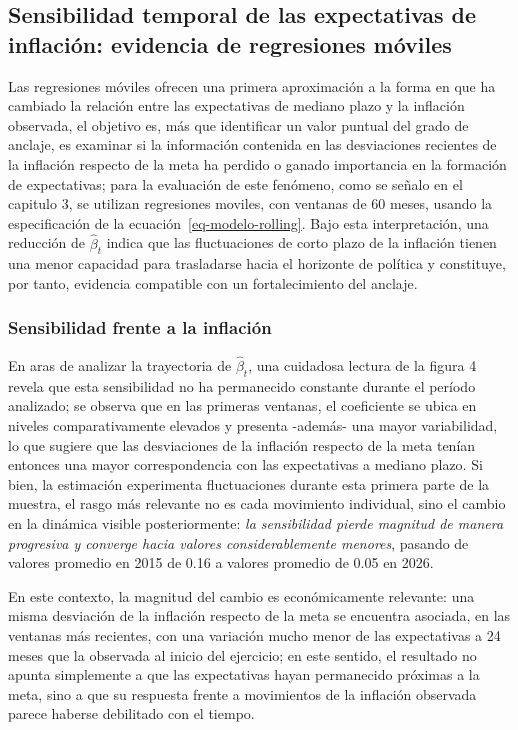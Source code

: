 \documentclass[
  10.5pt,
  letterpaper,
  twocolumn]{article}
\begin{document}
\subsection{Sensibilidad temporal de las expectativas de inflación:
evidencia de regresiones
móviles}\label{sensibilidad-temporal-de-las-expectativas-de-inflaciuxf3n-evidencia-de-regresiones-muxf3viles}

Las regresiones móviles ofrecen una primera aproximación a la forma en
que ha cambiado la relación entre las expectativas de mediano plazo y la
inflación observada, el objetivo es, más que identificar un valor
puntual del grado de anclaje, es examinar si la información contenida en
las desviaciones recientes de la inflación respecto de la meta ha
perdido o ganado importancia en la formación de expectativas; para la
evaluación de este fenómeno, como se señalo en el capitulo 3, se
utilizan regresiones moviles, con ventanas de 60 meses, usando la
especificación de la ecuación~\ref{eq-modelo-rolling}. Bajo esta
interpretación, una reducción de \(\widehat{\beta}_t\) indica que las
fluctuaciones de corto plazo de la inflación tienen una menor capacidad
para trasladarse hacia el horizonte de política y constituye, por tanto,
evidencia compatible con un fortalecimiento del anclaje.

\subsubsection{Sensibilidad frente a la
inflación}\label{sensibilidad-frente-a-la-inflaciuxf3n}

En aras de analizar la trayectoria de \(\widehat{\beta}_t\), una
cuidadosa lectura de la figura 4 revela que esta sensibilidad no ha
permanecido constante durante el período analizado; se observa que en
las primeras ventanas, el coeficiente se ubica en niveles
comparativamente elevados y presenta -además- una mayor variabilidad, lo
que sugiere que las desviaciones de la inflación respecto de la meta
tenían entonces una mayor correspondencia con las expectativas a mediano
plazo. Si bien, la estimación experimenta fluctuaciones durante esta
primera parte de la muestra, el rasgo más relevante no es cada
movimiento individual, sino el cambio en la dinámica visible
posteriormente: \emph{la sensibilidad pierde magnitud de manera
progresiva y converge hacia valores considerablemente menores}, pasando
de valores promedio en 2015 de 0.16 a valores promedio de 0.05 en 2026.

En este contexto, la magnitud del cambio es económicamente relevante:
una misma desviación de la inflación respecto de la meta se encuentra
asociada, en las ventanas más recientes, con una variación mucho menor
de las expectativas a 24 meses que la observada al inicio del ejercicio;
en este sentido, el resultado no apunta simplemente a que las
expectativas hayan permanecido próximas a la meta, sino a que su
respuesta frente a movimientos de la inflación observada parece haberse
debilitado con el tiempo.
\end{document}
